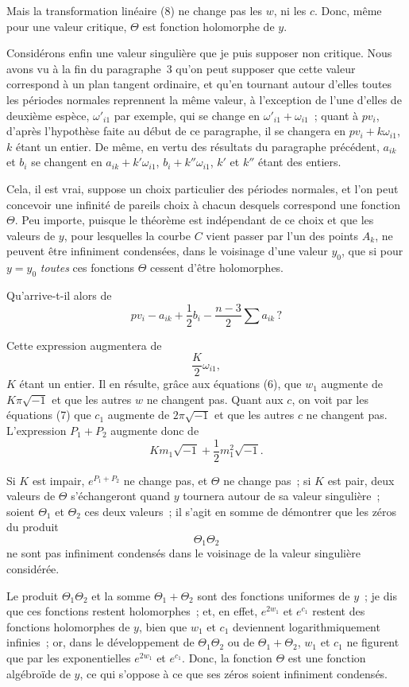 \documentclass{article}
\begin{document}
Mais la transformation linéaire (8) ne change pas les $w$, ni les $c$. Donc, même pour une valeur critique, $\Theta$ est fonction holomorphe de $y$.

Considérons enfin une valeur singulière que je puis supposer non critique. Nous avons vu à la fin du paragraphe~3 qu'on peut supposer que cette valeur correspond à un plan tangent ordinaire, et qu'en tournant autour d'elles toutes les périodes normales reprennent la même valeur, à l'exception de l'une d'elles de deuxième espèce, $\omega'_{i1}$ par exemple, qui se change en $\omega'_{i1} + \omega_{i1}$~; quant à $p v_{i}$, d'après l'hypothèse faite au début de ce paragraphe, il se changera en $p v_{i} + k \omega_{i1}$, $k$ étant un entier. De même, en vertu des résultats du paragraphe précédent, $a_{ik}$ et $b_{i}$ se changent en $a_{ik} + k' \omega_{i1}$, $b_{i} + k'' \omega_{i1}$, $k'$ et $k''$ étant des entiers.

Cela, il est vrai, suppose un choix particulier des périodes normales, et l'on peut concevoir une infinité de pareils choix à chacun desquels correspond une fonction $\Theta$. Peu importe, puisque le théorème est indépendant de ce choix et que les valeurs de $y$, pour lesquelles la courbe $C$ vient passer par l'un des points $A_{k}$, ne peuvent être infiniment condensées, dans le voisinage d'une valeur $y_{0}$, que si pour $y = y_{0}$ \emph{toutes} ces fonctions $\Theta$ cessent d'être holomorphes.

Qu'arrive-t-il alors de
\[
p v_{i} - a_{ik} + \frac{1}{2} b_{i} - \frac{n - 3}{2} \sum a_{ik} \, ?
\]

Cette expression augmentera de
\[
\frac{K}{2} \omega_{i1},
\]
$K$ étant un entier. Il en résulte, grâce aux équations (6), que $w_{1}$ augmente
de $K \pi \sqrt{-1}$ et que les autres $w$ ne changent pas. Quant aux $c$, on voit par les équations (7) que $c_{1}$ augmente de $2 \pi \sqrt{-1}$ et que les autres $c$ ne changent pas. L'expression $P_{1} + P_{2}$ augmente donc de
\[
K m_{1} \sqrt{-1} + \frac{1}{2} m_{1}^{2} \sqrt{-1}.
\]

Si $K$ est impair, $e^{P_{1} + P_{2}}$ ne change pas, et $\Theta$ ne change pas~; si $K$ est pair, deux valeurs de $\Theta$ s'échangeront quand $y$ tournera autour de sa valeur singulière~; soient $\Theta_{1}$ et $\Theta_{2}$ ces deux valeurs~; il s'agit en somme de démontrer que les zéros du produit
\[
\Theta_{1} \Theta_{2}
\]
ne sont pas infiniment condensés dans le voisinage de la valeur singulière considérée.

Le produit $\Theta_{1} \Theta_{2}$ et la somme $\Theta_{1} + \Theta_{2}$ sont des fonctions uniformes de $y$~; je dis que ces fonctions restent holomorphes~; et, en effet, $e^{2 w_{1}}$ et $e^{c_{1}}$ restent des fonctions holomorphes de $y$, bien que $w_{1}$ et $c_{1}$ deviennent logarithmiquement infinies~; or, dans le développement de $\Theta_{1} \Theta_{2}$ ou de $\Theta_{1} + \Theta_{2}$, $w_{1}$ et $c_{1}$ ne figurent que par les exponentielles $e^{2 w_{1}}$ et $e^{c_{1}}$. Donc, la fonction $\Theta$ est une fonction algébroïde de $y$, ce qui s'oppose à ce que ses zéros soient infiniment condensés.
\end{document}
